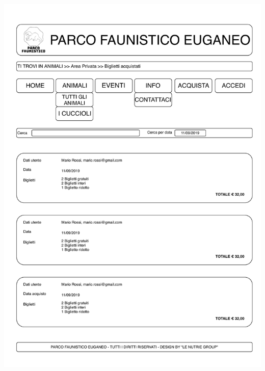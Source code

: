 \begin{center}
\begin{minipage}{0.4\linewidth}
            \includegraphics[width=\linewidth]{./../docs/Analisi/bozze/riepilogoAcquisti.pdf}
        \end{minipage}
        \hfill
        \begin{minipage}{0.4\linewidth}

\end{minipage}
\end{center}
